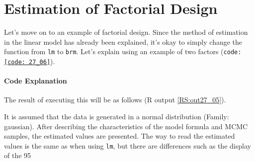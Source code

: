 \documentclass{ltjbook}
\begin{document}


\section{Estimation of Factorial Design}
Let's move on to an example of factorial design. Since the method of estimation in the linear model has already been explained, it's okay to simply change the function from \texttt{lm} to \texttt{brm}. Let's explain using an example of two factors (\texttt{code: \ref{code: 27_06}}).


\paragraph{Code Explanation}

The result of executing this will be as follows (R output \ref{RS:out27_05}).

It is assumed that the data is generated in a normal distribution (Family: gaussian). After describing the characteristics of the model formula and MCMC samples, the estimated values are presented. The way to read the estimated values is the same as when using \texttt{lm}, but there are differences such as the display of the 95%
\end{document}
